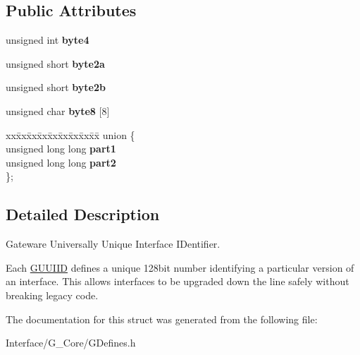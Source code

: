 \subsection*{Public Attributes}
\begin{DoxyCompactItemize}
\item 
unsigned int {\bfseries byte4}\hypertarget{structGW_1_1GUUIID_a017e04c2cb5c5bab165bf4ec0fa3ca55}{}\label{structGW_1_1GUUIID_a017e04c2cb5c5bab165bf4ec0fa3ca55}

\item 
unsigned short {\bfseries byte2a}\hypertarget{structGW_1_1GUUIID_a57b18450de3bffef5a6e39d9dcb6b68f}{}\label{structGW_1_1GUUIID_a57b18450de3bffef5a6e39d9dcb6b68f}

\item 
unsigned short {\bfseries byte2b}\hypertarget{structGW_1_1GUUIID_ab5045e59e0d3aa82a27208a063b9cbb6}{}\label{structGW_1_1GUUIID_ab5045e59e0d3aa82a27208a063b9cbb6}

\item 
unsigned char {\bfseries byte8} \mbox{[}8\mbox{]}\hypertarget{structGW_1_1GUUIID_a631f2e8efb3ddd9794c068e0b9000cce}{}\label{structGW_1_1GUUIID_a631f2e8efb3ddd9794c068e0b9000cce}

\item 
\begin{tabbing}
xx\=xx\=xx\=xx\=xx\=xx\=xx\=xx\=xx\=\kill
union \{\\
\>unsigned long long {\bfseries part1}\\
\>unsigned long long {\bfseries part2}\\
\}; \hypertarget{structGW_1_1GUUIID_aa51f004bf72e52a4e15b7568b9a7ec50}{}\label{structGW_1_1GUUIID_aa51f004bf72e52a4e15b7568b9a7ec50}
\\

\end{tabbing}\end{DoxyCompactItemize}


\subsection{Detailed Description}
Gateware Universally Unique Interface I\+Dentifier. 

Each \hyperlink{structGW_1_1GUUIID}{G\+U\+U\+I\+ID} defines a unique 128bit number identifying a particular version of an interface. This allows interfaces to be upgraded down the line safely without breaking legacy code. 

The documentation for this struct was generated from the following file\+:\begin{DoxyCompactItemize}
\item 
Interface/\+G\+\_\+\+Core/G\+Defines.\+h\end{DoxyCompactItemize}
